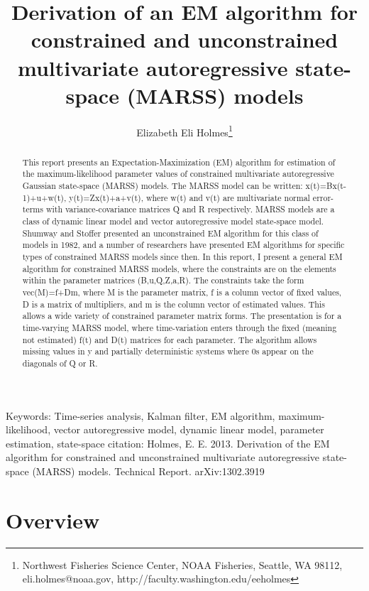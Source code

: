 \documentclass[]{article}
\begin{document}

\author{Elizabeth Eli Holmes\footnote{Northwest Fisheries Science Center, NOAA Fisheries, Seattle, WA 98112, 
       eli.holmes@noaa.gov, http://faculty.washington.edu/eeholmes}}
\title{Derivation of an EM algorithm for constrained and unconstrained multivariate autoregressive state-space (MARSS) models}
\maketitle
\begin{abstract}
This report presents an Expectation-Maximization (EM) algorithm for estimation of the maximum-likelihood parameter values of constrained multivariate autoregressive Gaussian state-space (MARSS) models.  The MARSS model can be written: x(t)=Bx(t-1)+u+w(t), y(t)=Zx(t)+a+v(t), where w(t) and v(t) are multivariate normal error-terms with variance-covariance matrices Q and R respectively.  MARSS models are a class of dynamic linear model and vector autoregressive model state-space model. Shumway and Stoffer presented an unconstrained EM algorithm for this class of models in 1982, and a number of researchers have presented EM algorithms for specific types of constrained MARSS models since then.  In this report, I present a general EM algorithm for constrained MARSS models, where the constraints are on the elements within the parameter matrices (B,u,Q,Z,a,R). The constraints take the form vec(M)=f+Dm, where M is the parameter matrix, f is a column vector of fixed values, D is a matrix of multipliers, and m is the column vector of estimated values.  This allows a wide variety of constrained parameter matrix forms.  The presentation is for a time-varying MARSS model, where time-variation enters through the fixed (meaning not estimated) f(t) and D(t) matrices for each parameter.  The algorithm allows missing values in y and partially deterministic systems where 0s appear on the diagonals of Q or R.
\end{abstract}
Keywords: Time-series analysis, Kalman filter, EM algorithm, maximum-likelihood, vector autoregressive model, dynamic linear model, parameter estimation, state-space
\vfill
{\noindent \small citation: Holmes, E. E. 2013. Derivation of the EM algorithm for constrained and unconstrained multivariate autoregressive state-space (MARSS) models. Technical Report. arXiv:1302.3919 }
 \newpage
\section{Overview}
\end{document}
